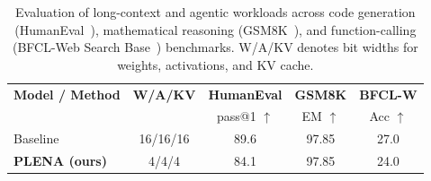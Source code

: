 \begin{table}[t]
\centering
\caption{Evaluation of long-context and agentic workloads across code generation (HumanEval~\cite{chen2021codex}), mathematical reasoning (GSM8K~\cite{cobbe2021training}), and function-calling (BFCL-Web Search Base~\cite{patil2025berkeley}) benchmarks. W/A/KV denotes bit widths for weights, activations, and KV cache.}
\label{tab:long_context_agentic}
\begin{tabular}{lc ccc}
    \toprule
    \textbf{Model / Method} & \textbf{W/A/KV} & \textbf{HumanEval} & \textbf{GSM8K} & \textbf{BFCL-W} \\
     & & pass@1 $\uparrow$ & EM $\uparrow$ & Acc $\uparrow$ \\
    \midrule
    \quad Baseline              & 16/16/16 & 89.6 & 97.85 & 27.0 \\
    \quad \textbf{PLENA (ours)} & 4/4/4    & 84.1   & 97.85  & 24.0 \\
    \bottomrule
\end{tabular}
\vspace{-10pt}
\end{table}

\begin{table}[t]
\centering
\caption{Ablation study of quantization techniqeus on Qwen3 model across HumanEval, GSM8K, and BFCL-Web Search Base. $\mathrm{Err}_{y}$ denotes output-norm clipping. Qwen3-8B on HumanEval and GSM8K, Qwen3-32B on BFCL-Web Search Base. Results for HumanEval and GSM8K use Qwen3-8B; results for BFCL-Web Search Base use Qwen3-32B, as its higher baseline accuracy better isolates the effect of quantization.}
\label{tab:ablation_new}
\vspace{-10pt}
\end{table}

